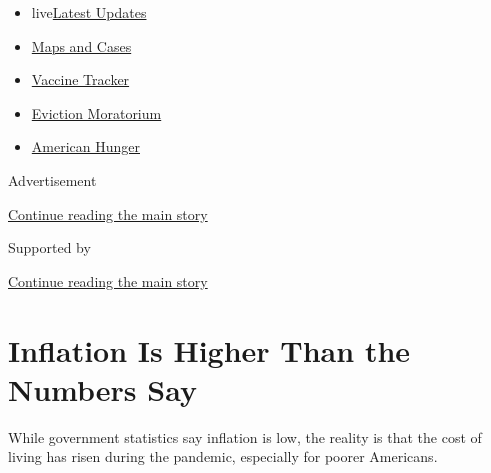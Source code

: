 \begin{itemize}
\tightlist
\item
  live\href{https://www.nytimes3xbfgragh.onion/2020/09/08/world/covid-19-coronavirus.html?name=styln-coronavirus-markets\&region=TOP_BANNER\&block=storyline_menu_recirc\&action=click\&pgtype=Article\&impression_id=25791371-f1c3-11ea-a0c5-d9bb321ace9a\&variant=undefined}{Latest
  Updates}
\item
  \href{https://www.nytimes3xbfgragh.onion/interactive/2020/us/coronavirus-us-cases.html?name=styln-coronavirus-markets\&region=TOP_BANNER\&block=storyline_menu_recirc\&action=click\&pgtype=Article\&impression_id=25793a80-f1c3-11ea-a0c5-d9bb321ace9a\&variant=undefined}{Maps
  and Cases}
\item
  \href{https://www.nytimes3xbfgragh.onion/interactive/2020/science/coronavirus-vaccine-tracker.html?name=styln-coronavirus-markets\&region=TOP_BANNER\&block=storyline_menu_recirc\&action=click\&pgtype=Article\&impression_id=25793a81-f1c3-11ea-a0c5-d9bb321ace9a\&variant=undefined}{Vaccine
  Tracker}
\item
  \href{https://www.nytimes3xbfgragh.onion/2020/09/02/your-money/eviction-moratorium-covid.html?name=styln-coronavirus-markets\&region=TOP_BANNER\&block=storyline_menu_recirc\&action=click\&pgtype=Article\&impression_id=25793a82-f1c3-11ea-a0c5-d9bb321ace9a\&variant=undefined}{Eviction
  Moratorium}
\item
  \href{https://www.nytimes3xbfgragh.onion/interactive/2020/09/02/magazine/food-insecurity-hunger-us.html?name=styln-coronavirus-markets\&region=TOP_BANNER\&block=storyline_menu_recirc\&action=click\&pgtype=Article\&impression_id=25793a83-f1c3-11ea-a0c5-d9bb321ace9a\&variant=undefined}{American
  Hunger}
\end{itemize}

Advertisement

\protect\hyperlink{after-top}{Continue reading the main story}

Supported by

\protect\hyperlink{after-sponsor}{Continue reading the main story}

\hypertarget{inflation-is-higher-than-the-numbers-say}{%
\section{Inflation Is Higher Than the Numbers
Say}\label{inflation-is-higher-than-the-numbers-say}}

While government statistics say inflation is low, the reality is that
the cost of living has risen during the pandemic, especially for poorer
Americans.

